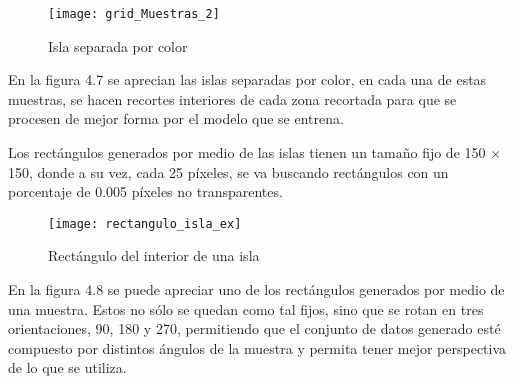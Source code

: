 \begin{figure}[H]
  \centering
  \begin{minipage}[b]{0.6\textwidth}
        \texttt{[image: grid\_Muestras\_2]}
    \caption{Isla separada por color}
  \end{minipage}
\end{figure}

En la figura 4.7 se aprecian las islas separadas por color, en cada una de estas muestras, se hacen recortes interiores de cada zona recortada para que se procesen de mejor forma por el modelo que se entrena. 

Los rectángulos generados por medio de las islas tienen un tamaño fijo de 150  $\times$ 150, donde a su vez, cada 25 píxeles, se va buscando rectángulos con un porcentaje de 0.005 píxeles no transparentes.


\begin{figure}[h]
  \centering
  \begin{minipage}[b]{0.7\textwidth}
        \texttt{[image: rectangulo\_isla\_ex]}
    \caption{Rectángulo del interior de una isla}
  \end{minipage}
\end{figure}


En la figura 4.8 se puede apreciar uno de los rectángulos generados por medio de una muestra. Estos no sólo se quedan como tal fijos, sino que se rotan en tres orientaciones, 90, 180 y 270, permitiendo que el conjunto de datos generado esté compuesto por distintos ángulos de la muestra y permita tener mejor perspectiva de lo que se utiliza.

\break

%
%
%
%
%

